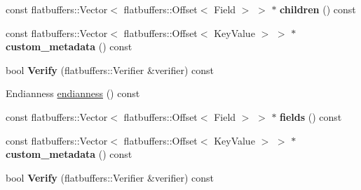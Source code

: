 \begin{DoxyCompactItemize}
\item 
const flatbuffers\+::\+Vector$<$ flatbuffers\+::\+Offset$<$ Field $>$ $>$ $\ast$ {\bfseries children} () const \hypertarget{structorg_1_1apache_1_1arrow_1_1flatbuf_1_1FLATBUFFERS__FINAL__CLASS_a07630c376940e829e1b949ed123afe17}{}\label{structorg_1_1apache_1_1arrow_1_1flatbuf_1_1FLATBUFFERS__FINAL__CLASS_a07630c376940e829e1b949ed123afe17}

\item 
const flatbuffers\+::\+Vector$<$ flatbuffers\+::\+Offset$<$ Key\+Value $>$ $>$ $\ast$ {\bfseries custom\+\_\+metadata} () const \hypertarget{structorg_1_1apache_1_1arrow_1_1flatbuf_1_1FLATBUFFERS__FINAL__CLASS_a7a7e36a6964b31926622fdfd0c0c73b4}{}\label{structorg_1_1apache_1_1arrow_1_1flatbuf_1_1FLATBUFFERS__FINAL__CLASS_a7a7e36a6964b31926622fdfd0c0c73b4}

\item 
bool {\bfseries Verify} (flatbuffers\+::\+Verifier \&verifier) const \hypertarget{structorg_1_1apache_1_1arrow_1_1flatbuf_1_1FLATBUFFERS__FINAL__CLASS_af3e217fc40beb9b315e3979010413969}{}\label{structorg_1_1apache_1_1arrow_1_1flatbuf_1_1FLATBUFFERS__FINAL__CLASS_af3e217fc40beb9b315e3979010413969}

\item 
Endianness \hyperlink{structorg_1_1apache_1_1arrow_1_1flatbuf_1_1FLATBUFFERS__FINAL__CLASS_a3cb8166b9d30c27313f3387a6d775a07}{endianness} () const 
\item 
const flatbuffers\+::\+Vector$<$ flatbuffers\+::\+Offset$<$ Field $>$ $>$ $\ast$ {\bfseries fields} () const \hypertarget{structorg_1_1apache_1_1arrow_1_1flatbuf_1_1FLATBUFFERS__FINAL__CLASS_afec9f05ba236bf768c82a36781bcbc00}{}\label{structorg_1_1apache_1_1arrow_1_1flatbuf_1_1FLATBUFFERS__FINAL__CLASS_afec9f05ba236bf768c82a36781bcbc00}

\item 
const flatbuffers\+::\+Vector$<$ flatbuffers\+::\+Offset$<$ Key\+Value $>$ $>$ $\ast$ {\bfseries custom\+\_\+metadata} () const \hypertarget{structorg_1_1apache_1_1arrow_1_1flatbuf_1_1FLATBUFFERS__FINAL__CLASS_a7a7e36a6964b31926622fdfd0c0c73b4}{}\label{structorg_1_1apache_1_1arrow_1_1flatbuf_1_1FLATBUFFERS__FINAL__CLASS_a7a7e36a6964b31926622fdfd0c0c73b4}

\item 
bool {\bfseries Verify} (flatbuffers\+::\+Verifier \&verifier) const \hypertarget{structorg_1_1apache_1_1arrow_1_1flatbuf_1_1FLATBUFFERS__FINAL__CLASS_af3e217fc40beb9b315e3979010413969}{}\label{structorg_1_1apache_1_1arrow_1_1flatbuf_1_1FLATBUFFERS__FINAL__CLASS_af3e217fc40beb9b315e3979010413969}


\end{DoxyCompactItemize}
